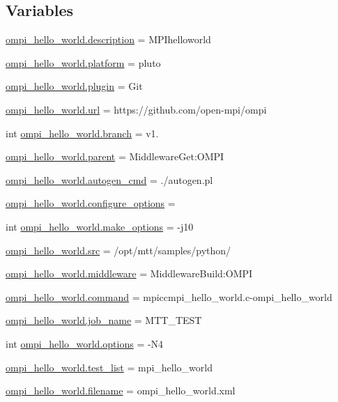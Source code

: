 \subsection*{Variables}
\begin{DoxyCompactItemize}
\item 
\hyperlink{namespaceompi__hello__world_a52b9c10821e333fe5c7413d414abeb1b}{ompi\-\_\-hello\-\_\-world.\-description} = M\-P\-Ihelloworld
\item 
\hyperlink{namespaceompi__hello__world_af8ab2503d0ec334a65a72e930a24e713}{ompi\-\_\-hello\-\_\-world.\-platform} = pluto
\item 
\hyperlink{namespaceompi__hello__world_a687eab84563b30840a200bfaf5407f51}{ompi\-\_\-hello\-\_\-world.\-plugin} = Git
\item 
\hyperlink{namespaceompi__hello__world_ae0dcf6cc43abc8d11428686639a5059a}{ompi\-\_\-hello\-\_\-world.\-url} = https\-://github.\-com/open-\/mpi/ompi
\item 
int \hyperlink{namespaceompi__hello__world_a34c1b9feb533b831fb7b0cd036494718}{ompi\-\_\-hello\-\_\-world.\-branch} = v1.
\item 
\hyperlink{namespaceompi__hello__world_a5508612e06f3402554fdda7a9eca7d62}{ompi\-\_\-hello\-\_\-world.\-parent} = Middleware\-Get\-:\-O\-M\-P\-I
\item 
\hyperlink{namespaceompi__hello__world_ab26bf3479d404017c9d0623f42e9dcd3}{ompi\-\_\-hello\-\_\-world.\-autogen\-\_\-cmd} = ./autogen.\-pl
\item 
\hyperlink{namespaceompi__hello__world_a7b6bd890daea8a06c3daea5019b415f1}{ompi\-\_\-hello\-\_\-world.\-configure\-\_\-options} =
\item 
int \hyperlink{namespaceompi__hello__world_a3b1603e3acde68a17311cb93a6a5ef12}{ompi\-\_\-hello\-\_\-world.\-make\-\_\-options} = -\/j10
\item 
\hyperlink{namespaceompi__hello__world_a89cf2df98bd1f53501da343b4a25846c}{ompi\-\_\-hello\-\_\-world.\-src} = /opt/mtt/samples/python/
\item 
\hyperlink{namespaceompi__hello__world_a64807561a94c3ff5b1c9a945e580f643}{ompi\-\_\-hello\-\_\-world.\-middleware} = Middleware\-Build\-:\-O\-M\-P\-I
\item 
\hyperlink{namespaceompi__hello__world_a8e605d382654baee6320ca445c211c82}{ompi\-\_\-hello\-\_\-world.\-command} = mpiccmpi\-\_\-hello\-\_\-world.\-c-\/ompi\-\_\-hello\-\_\-world
\item 
\hyperlink{namespaceompi__hello__world_a6aa613720eb4f4129d00b6469b68d7cf}{ompi\-\_\-hello\-\_\-world.\-job\-\_\-name} = M\-T\-T\-\_\-\-T\-E\-S\-T
\item 
int \hyperlink{namespaceompi__hello__world_a4bc86d53822edfbcb8b35e8fc40d0075}{ompi\-\_\-hello\-\_\-world.\-options} = -\/N4
\item 
\hyperlink{namespaceompi__hello__world_a7df798e8beb69ae3bf2537c25e7b7370}{ompi\-\_\-hello\-\_\-world.\-test\-\_\-list} = mpi\-\_\-hello\-\_\-world
\item 
\hyperlink{namespaceompi__hello__world_ae42ce8011012447dba87c7337e9ddab8}{ompi\-\_\-hello\-\_\-world.\-filename} = ompi\-\_\-hello\-\_\-world.\-xml
\end{DoxyCompactItemize}
